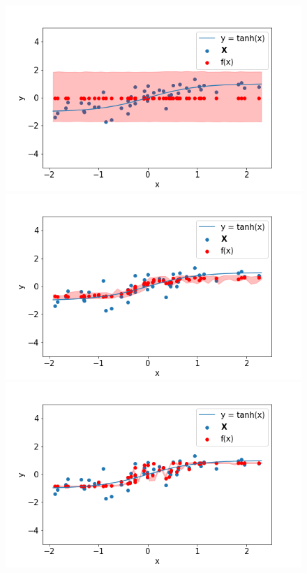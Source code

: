 \begin{figure}
 \begin{minipage}[]{.3\textwidth}
    \includegraphics[width=\textwidth]{plot_10kld.png}
\subcaption{}
\end{minipage}
 \begin{minipage}{.3\textwidth}
    \includegraphics[width=\textwidth]{plot_10elbo.png}
\subcaption{}
\end{minipage}
 \begin{minipage}{.3\textwidth}
    \includegraphics[width=\textwidth]{plot_10overfit.png}
\subcaption{}
\end{minipage}


\end{figure}
